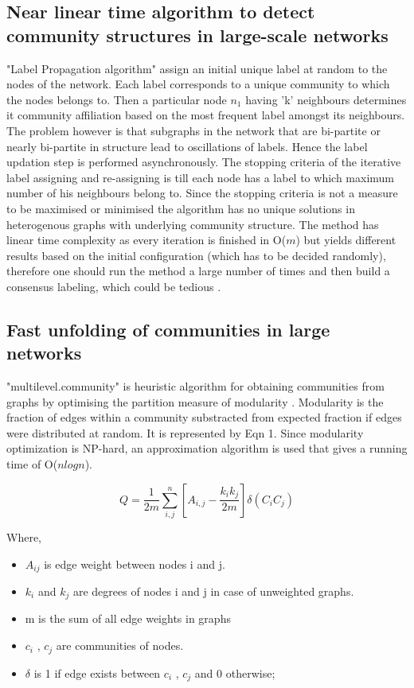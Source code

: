 \subsection{Near linear time algorithm to detect community structures in large-scale networks}
"Label Propagation algorithm" assign an initial unique label at random to the nodes of the network. Each label corresponds to a unique community to which the nodes belongs to. Then a particular node $n_1$ having 'k' neighbours determines it community affiliation based on the most frequent label amongst its neighbours. The problem however is that subgraphs in the
network that are bi-partite or nearly bi-partite in structure lead to oscillations of labels. Hence the label updation step is performed asynchronously. The stopping criteria of the iterative label assigning and re-assigning is till each node has a label to which maximum number of his neighbours belong to. Since the stopping criteria is not a measure to be maximised or minimised the algorithm has no unique solutions in heterogenous graphs with underlying community structure. The method has linear time complexity as every iteration is finished in O($m$) but yields different results based on the initial configuration (which has to be decided randomly), therefore one should run the method a large number of times and then build a consensus labeling, which could be tedious \cite{aps:34}. 

\subsection{Fast unfolding of communities in large networks}
"multilevel.community" is heuristic algorithm for obtaining communities from graphs by optimising the partition measure of modularity \cite{aps:35}. Modularity is the fraction of edges within a community substracted from expected fraction if edges were distributed at random. It is represented by Eqn 1. Since modularity optimization is NP-hard, an approximation algorithm is used that gives a running time of O($nlogn$). 

\begin{equation}
Q = \frac{1}{2m}\sum_{i,j}^{n} [A_{i,j} - \frac{k_i k_j}{2m} ] \delta (C_i C_j) 
\end{equation}

Where,
\begin{itemize}
\item $A_{ij}$ is edge weight between nodes i and j.
\item $k_i$ and $k_j$ are degrees of nodes i and j in case of unweighted graphs.
\item m is the sum of all edge weights in graphs
\item $c_i$ , $c_j$ are communities of nodes.
\item $\delta$ is 1 if edge exists between $c_i$ , $c_j$ and 0 otherwise;
\end{itemize}

